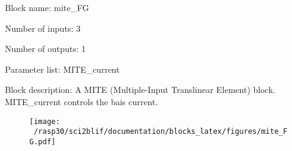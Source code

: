 \pagebreak

Block name: mite\_FG

Number of inputs: 3

Number of outputs: 1

Parameter list: MITE\_current

Block description: 
A MITE (Multiple-Input Translinear Element) block. MITE\_current controls the bais current.

\begin{figure}[H]  %
\texttt{[image: ~/rasp30/sci2blif/documentation/blocks\_latex/figures/mite\_FG.pdf]}
\end{figure}

